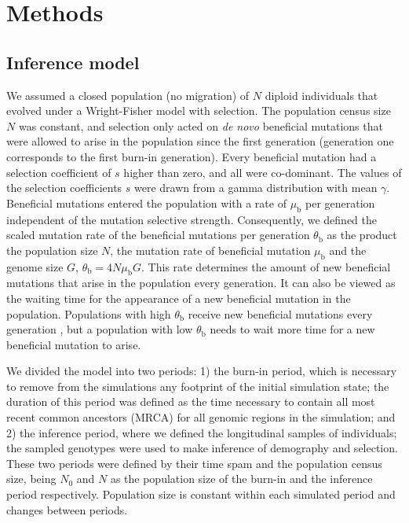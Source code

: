 \documentclass[a4paper, 12pt]{article}
\begin{document}
\section*{Methods}

\subsection*{Inference model}

We assumed a closed population (no migration) of $N$ diploid individuals that evolved under a Wright-Fisher model with selection. The population census size $N$ was constant, and selection only acted on \textit{de novo} beneficial mutations that were allowed to arise in the population since the first generation (generation one corresponds to the first burn-in generation). Every beneficial mutation had a selection coefficient of $s$ higher than zero, and all were co-dominant. The values of the selection coefficients $s$ were drawn from a gamma distribution with mean $\gamma$. Beneficial mutations entered the population with a rate of $\mu_\mathrm{b}$ per generation independent of the mutation selective strength. Consequently, we defined the scaled mutation rate of the beneficial mutations per generation $\theta_\mathrm{b}$ as the product the population size $N$, the mutation rate of beneficial mutation $\mu_\mathrm{b}$ and the genome size $G$, $\theta_\mathrm{b} = 4N\mu_\mathrm{b}G$. This rate determines the amount of new beneficial mutations that arise in the population every generation. It can also be viewed as the waiting time for the appearance of a new beneficial mutation in the population. Populations with high $\theta_\mathrm{b}$ receive new beneficial mutations every generation \citep{Karasov:2010di}, but a population with low $\theta_\mathrm{b}$ needs to wait more time for a new beneficial mutation to arise.

We divided the model into two periods: 1) the burn-in period, which is necessary to remove from the simulations any footprint of the initial simulation state; the duration of this period was defined as the time necessary to contain all most recent common ancestors (MRCA) for all genomic regions in the simulation; and 2) the inference period, where we defined the longitudinal samples of individuals; the sampled genotypes were used to make inference of demography and selection. These two periods were defined by their time spam and the population census size, being $N_\mathrm{0}$ and $N$ as the population size of the burn-in and the inference period respectively. Population size is constant within each simulated period and changes between periods.
\end{document}
